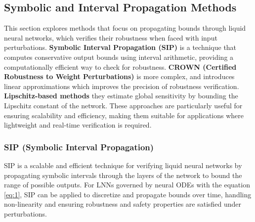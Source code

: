 \subsection*{Symbolic and Interval Propagation Methods}

This section explores methods that focus on propagating bounds through liquid neural networks, which verifies their robustness when faced with input perturbations. \textbf{Symbolic Interval Propagation (SIP)} is a technique that computes conservative output bounds using interval arithmetic, providing a computationally efficient way to check for robustness. \textbf{CROWN (Certified Robustness to Weight Perturbations)} is more complex, and introduces linear approximations which improves the precision of robustness verification. \textbf{Lipschitz-based methods} they estimate global sensitivity by bounding the Lipschitz constant of the network. These approaches are particularly useful for ensuring scalability and efficiency, making them suitable for applications where lightweight and real-time verification is required.

\subsubsection*{SIP (Symbolic Interval Propagation)}

SIP is a scalable and efficient technique for verifying liquid neural networks by propagating symbolic intervals through the layers of the network to bound the range of possible outputs. For LNNs governed by neural ODEs with the equation \ref{eq:1}, SIP can be applied to discretize and propagate bounds over time, handling non-linearity and ensuring robustness and safety properties are satisfied under perturbations.

